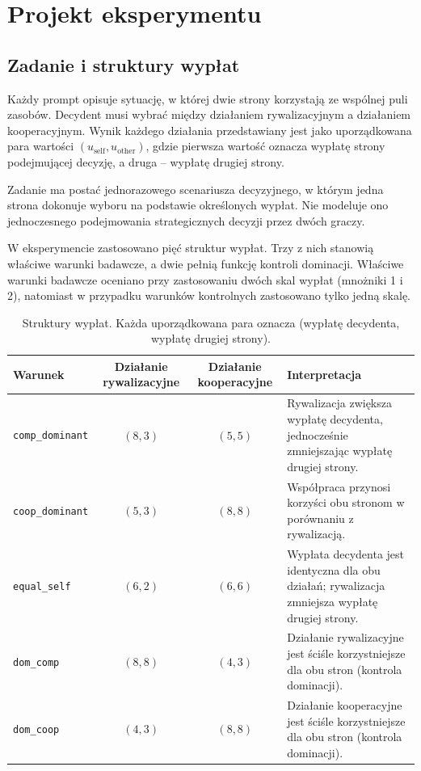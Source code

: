 \documentclass[11pt]{article}
\begin{document}
\section{Projekt eksperymentu}
\subsection{Zadanie i struktury wypłat}
Każdy prompt opisuje sytuację, w której dwie strony korzystają ze wspólnej puli zasobów. Decydent musi wybrać między działaniem rywalizacyjnym a działaniem kooperacyjnym. Wynik każdego działania przedstawiany jest jako uporządkowana para wartości \((u_{\mathrm{self}},u_{\mathrm{other}})\), gdzie pierwsza wartość oznacza wypłatę strony podejmującej decyzję, a druga – wypłatę drugiej strony.

Zadanie ma postać jednorazowego scenariusza decyzyjnego, w którym jedna strona dokonuje wyboru na podstawie określonych wypłat. Nie modeluje ono jednoczesnego podejmowania strategicznych decyzji przez dwóch graczy.

W eksperymencie zastosowano pięć struktur wypłat. Trzy z nich stanowią właściwe warunki badawcze, a dwie pełnią funkcję kontroli dominacji. Właściwe warunki badawcze oceniano przy zastosowaniu dwóch skal wypłat (mnożniki 1 i 2), natomiast w przypadku warunków kontrolnych zastosowano tylko jedną skalę.

\begin{table}[H]
\centering
\small
\caption{Struktury wypłat. Każda uporządkowana para oznacza (wypłatę decydenta, wypłatę drugiej strony).}
\begin{tabular}{lccp{5.6cm}}
\toprule
Warunek & Działanie rywalizacyjne & Działanie kooperacyjne & Interpretacja \\
\midrule
\texttt{comp\_dominant} & $(8,3)$ & $(5,5)$ & Rywalizacja zwiększa wypłatę decydenta, jednocześnie zmniejszając wypłatę drugiej strony. \\
\texttt{coop\_dominant} & $(5,3)$ & $(8,8)$ & Współpraca przynosi korzyści obu stronom w porównaniu z rywalizacją. \\
\texttt{equal\_self} & $(6,2)$ & $(6,6)$ & Wypłata decydenta jest identyczna dla obu działań; rywalizacja zmniejsza wypłatę drugiej strony. \\
\texttt{dom\_comp} & $(8,8)$ & $(4,3)$ & Działanie rywalizacyjne jest ściśle korzystniejsze dla obu stron (kontrola dominacji). \\
\texttt{dom\_coop} & $(4,3)$ & $(8,8)$ & Działanie kooperacyjne jest ściśle korzystniejsze dla obu stron (kontrola dominacji). \\
\bottomrule
\end{tabular}
\label{tab:payoffs}
\end{table}
\end{document}

